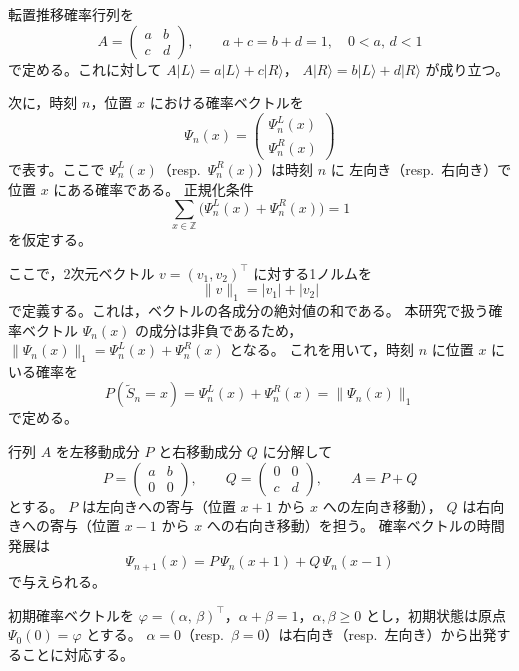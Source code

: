 \documentclass[a4j,dvipdfmx]{jsarticle}
\theoremstyle{plainnote}
\begin{document}
転置推移確率行列を
\[
  A = \begin{pmatrix} a & b \\ c & d \end{pmatrix}, \qquad
  a + c = b + d = 1, \quad 0 < a,\, d < 1
\]
で定める。これに対して
$A|L\rangle = a|L\rangle + c|R\rangle$，
$A|R\rangle = b|L\rangle + d|R\rangle$
が成り立つ。

次に，時刻 $n$，位置 $x$ における確率ベクトルを
\[
  \Psi_n(x) = \begin{pmatrix} \Psi_n^L(x) \\ \Psi_n^R(x) \end{pmatrix}
\]
で表す。ここで $\Psi_n^L(x)$（resp.\ $\Psi_n^R(x)$）は時刻 $n$ に
左向き（resp.\ 右向き）で位置 $x$ にある確率である。
正規化条件
\[
  \sum_{x \in \mathbb{Z}} \bigl(\Psi_n^L(x) + \Psi_n^R(x)\bigr) = 1
\]
を仮定する。

ここで，2次元ベクトル $v = (v_1, v_2)^\top$ に対する1ノルムを
\begin{equation}
  \|v\|_1 = |v_1| + |v_2|
  \label{eq:l1_norm}
\end{equation}
で定義する。これは，ベクトルの各成分の絶対値の和である。
本研究で扱う確率ベクトル $\Psi_n(x)$ の成分は非負であるため，
$\|\Psi_n(x)\|_1 = \Psi_n^L(x) + \Psi_n^R(x)$ となる。
これを用いて，時刻 $n$ に位置 $x$ にいる確率を
\[
  P(\tilde{S}_n = x) = \Psi_n^L(x) + \Psi_n^R(x) = \|\Psi_n(x)\|_1
\]
で定める。

行列 $A$ を左移動成分 $P$ と右移動成分 $Q$ に分解して
\[
  P = \begin{pmatrix} a & b \\ 0 & 0 \end{pmatrix}, \qquad
  Q = \begin{pmatrix} 0 & 0 \\ c & d \end{pmatrix}, \qquad
  A = P + Q
\]
とする。
$P$ は左向きへの寄与（位置 $x+1$ から $x$ への左向き移動），
$Q$ は右向きへの寄与（位置 $x-1$ から $x$ への右向き移動）を担う。
確率ベクトルの時間発展は
\begin{equation}
  \Psi_{n+1}(x) = P\,\Psi_n(x+1) + Q\,\Psi_n(x-1)
  \label{eq:crw_evolution}
\end{equation}
で与えられる。

初期確率ベクトルを
$\varphi = (\alpha,\,\beta)^\top$，$\alpha + \beta = 1$，$\alpha,\beta \geq 0$
とし，初期状態は原点 $\Psi_0(0) = \varphi$ とする。
$\alpha = 0$（resp.\ $\beta = 0$）は右向き（resp.\ 左向き）から出発することに対応する。

\end{document}
